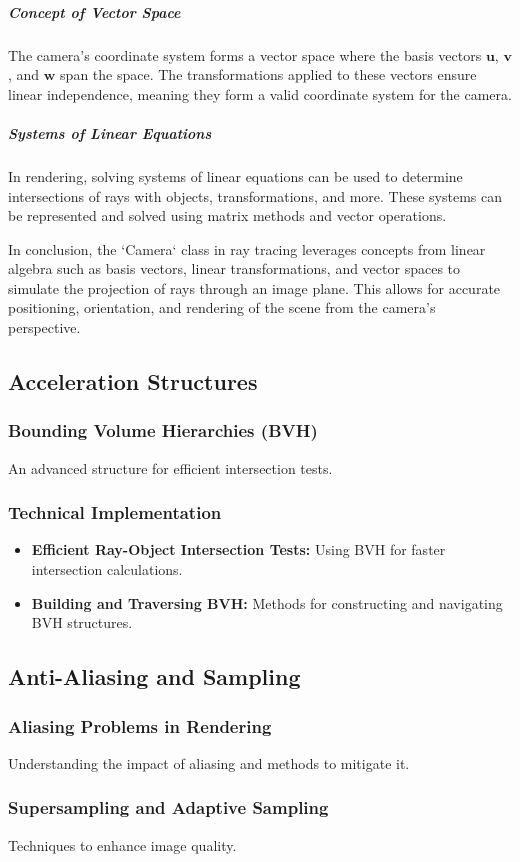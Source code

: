 \documentclass[12pt]{article}
\begin{document}
\subparagraph{Concept of Vector Space}
The camera’s coordinate system forms a vector space where the basis vectors \(\mathbf{u}\), \(\mathbf{v}\), and \(\mathbf{w}\) span the space. The transformations applied to these vectors ensure linear independence, meaning they form a valid coordinate system for the camera.

\subparagraph{Systems of Linear Equations}
In rendering, solving systems of linear equations can be used to determine intersections of rays with objects, transformations, and more. These systems can be represented and solved using matrix methods and vector operations.

In conclusion, the `Camera` class in ray tracing leverages concepts from linear algebra such as basis vectors, linear transformations, and vector spaces to simulate the projection of rays through an image plane. This allows for accurate positioning, orientation, and rendering of the scene from the camera's perspective.
\subsection{Acceleration Structures}
\subsubsection{Bounding Volume Hierarchies (BVH)}
An advanced structure for efficient intersection tests.
\subsubsection{Technical Implementation}
\begin{itemize}
    \item \textbf{Efficient Ray-Object Intersection Tests:} Using BVH for faster intersection calculations.
    \item \textbf{Building and Traversing BVH:} Methods for constructing and navigating BVH structures.
\end{itemize}

\subsection{Anti-Aliasing and Sampling}
\subsubsection{Aliasing Problems in Rendering}
Understanding the impact of aliasing and methods to mitigate it.
\subsubsection{Supersampling and Adaptive Sampling}
Techniques to enhance image quality.
\end{document}
